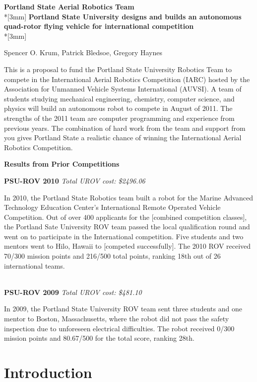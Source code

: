 \documentclass{article}
\begin{document}
\begin{center}
{\Large{\bf Portland State Aerial Robotics Team}}\\*[3mm]
{\bf Portland State University designs and builds an autonomous quad-rotor flying vehicle for international competition} \\*[3mm]

Spencer O. Krum, Patrick Bledsoe, Gregory Haynes

\end{center}


This is a  proposal to fund the Portland State University Robotics Team to compete in the  International Aerial Robotics Competition (IARC) hosted by the Association for Unmanned Vehicle Systems International (AUVSI). A team of students studying mechanical engineering,
 chemistry, computer science, and physics will build an autonomous robot to compete in August of 2011.  The strengths of the 2011 team are computer programming and experience from previous years. The combination of hard work 
from the team and support from you gives Portland State a realistic chance of winning the International Aerial Robotics Competition.  


\centerline{\bf Results from Prior Competitions}

\noindent
{\bf PSU-ROV 2010}
{\it Total UROV cost: \$2496.06}

In 2010, the Portland State Robotics team built a robot for the Marine Advanced Technology Education Center's International Remote Operated Vehicle Competition. Out of over 400 applicants for the [combined competition classes], the Portland Sate University ROV team passed the local qualification round and went on to participate in the International competition. 
Five students and two mentors went to Hilo, Hawaii to [competed successfully]. The 2010 ROV received 70/300 mission points and 216/500 total points, 
ranking 18th out of 26 international teams.

\ \\
\noindent
{\bf PSU-ROV 2009}
{\it Total UROV cost: \$481.10}

In 2009, the Portland State University ROV team sent three students and one mentor to Boston, Massachusetts, where the robot did not pass the safety inspection 
due to unforeseen electrical difficulties.  The robot received 0/300 mission points and 80.67/500 for the total score, ranking 28th. 


\section{Introduction}
\end{document}
